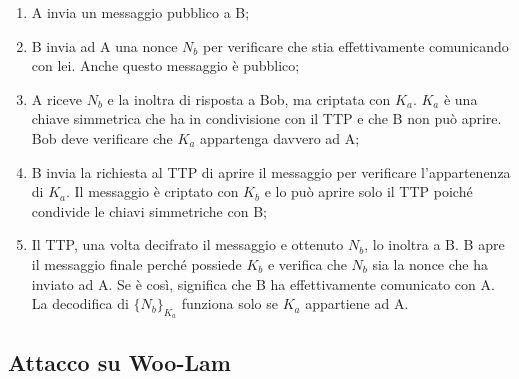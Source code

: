 \begin{enumerate}
    \item A invia un messaggio pubblico a B;
    \item B invia ad A una nonce \(N_b\) per verificare che stia
          effettivamente comunicando con lei. Anche questo messaggio è
          pubblico;
    \item A riceve \(N_b\) e la inoltra di risposta a Bob, ma criptata con
          \(K_a\). \(K_a\) è una chiave simmetrica che ha in condivisione con il
          TTP e che B non può aprire. Bob deve verificare che \(K_a\)
          appartenga davvero ad A;
    \item B invia la richiesta al TTP di aprire il messaggio per verificare
          l'appartenenza di \(K_a\). Il messaggio è criptato con \(K_b\) e lo
          può aprire solo il TTP poiché condivide le chiavi simmetriche con B;
    \item Il TTP, una volta decifrato il messaggio e ottenuto \(N_b\), lo
          inoltra a B. B apre il messaggio finale perché possiede \(K_b\) e
          verifica che \(N_b\) sia la nonce che ha inviato ad A. Se è così,
          significa che B ha effettivamente comunicato con A. La decodifica di
          \(\{N_b\}_{K_a}\) funziona solo se \(K_a\) appartiene ad A.
\end{enumerate}

\subsection{Attacco su Woo-Lam}

